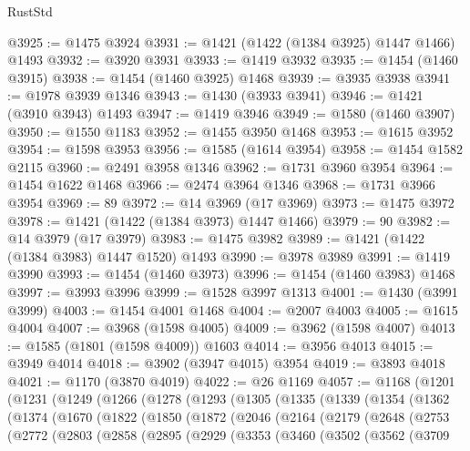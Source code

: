\begin{lexlean}{RustStd}
\begin{coremodule}
@3925 := @1475 @3924
@3931 := @1421 (@1422 (@1384 @3925) @1447 @1466) @1493
@3932 := @3920 @3931
@3933 := @1419 @3932
@3935 := @1454 (@1460 @3915)
@3938 := @1454 (@1460 @3925) @1468
@3939 := @3935 @3938
@3941 := @1978 @3939 @1346
@3943 := @1430 (@3933 @3941)
@3946 := @1421 (@3910 @3943) @1493
@3947 := @1419 @3946
@3949 := @1580 (@1460 @3907)
@3950 := @1550 @1183
@3952 := @1455 @3950 @1468
@3953 := @1615 @3952
@3954 := @1598 @3953
@3956 := @1585 (@1614 @3954)
@3958 := @1454 @1582 @2115
@3960 := @2491 @3958 @1346
@3962 := @1731 @3960 @3954
@3964 := @1454 @1622 @1468
@3966 := @2474 @3964 @1346
@3968 := @1731 @3966 @3954
@3969 := 89
@3972 := @14 @3969 (@17 @3969)
@3973 := @1475 @3972
@3978 := @1421 (@1422 (@1384 @3973) @1447 @1466)
@3979 := 90
@3982 := @14 @3979 (@17 @3979)
@3983 := @1475 @3982
@3989 := @1421 (@1422 (@1384 @3983) @1447 @1520) @1493
@3990 := @3978 @3989
@3991 := @1419 @3990
@3993 := @1454 (@1460 @3973)
@3996 := @1454 (@1460 @3983) @1468
@3997 := @3993 @3996
@3999 := @1528 @3997 @1313
@4001 := @1430 (@3991 @3999)
@4003 := @1454 @4001 @1468
@4004 := @2007 @4003
@4005 := @1615 @4004
@4007 := @3968 (@1598 @4005)
@4009 := @3962 (@1598 @4007)
@4013 := @1585 (@1801 (@1598 @4009)) @1603
@4014 := @3956 @4013
@4015 := @3949 @4014
@4018 := @3902 (@3947 @4015) @3954
@4019 := @3893 @4018
@4021 := @1170 (@3870 @4019)
@4022 := @26 @1169
@4057 := @1168
    (@1201
      (@1231
        (@1249
          (@1266
            (@1278
              (@1293
                (@1305
                  (@1335
                    (@1339
                      (@1354
                        (@1362
                          (@1374
                            (@1670
                              (@1822
                                (@1850
                                  (@1872
                                    (@2046
                                      (@2164
                                        (@2179
                                          (@2648
                                            (@2753
                                              (@2772
                                                (@2803
                                                  (@2858
                                                    (@2895
                                                      (@2929
                                                        (@3353
                                                          (@3460
                                                            (@3502
                                                              (@3562
                                                                (@3709

\end{coremodule}
\end{lexlean}
